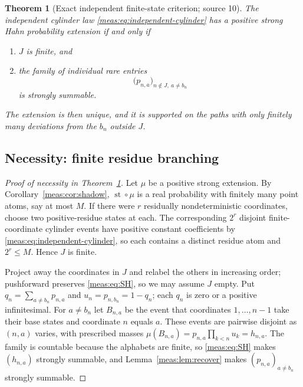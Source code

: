 \documentclass[11pt]{article}
\numberwithin{equation}{section}
\newtheorem{theorem}{Theorem}[section]
\theoremstyle{definition}
\theoremstyle{remark}
\newcommand{\st}{\operatorname{st}}
\begin{document}
\begin{theorem}[Exact independent finite-state criterion; source 10]
\label{meas:thm:independent}
The independent cylinder law \eqref{meas:eq:independent-cylinder} has a
positive strong Hahn probability extension if and only if
\begin{enumerate}[label=(\roman*)]
\item $J$ is finite, and
\item the family of individual rare entries
\begin{equation}\label{meas:eq:rare-family}
 \bigl(p_{n,a}\bigr)_{n\notin J,\ a\ne b_n}
\end{equation}
is strongly summable.
\end{enumerate}
The extension is then unique, and it is supported on the paths with only
finitely many deviations from the $b_n$ outside $J$.
\end{theorem}

\subsection{Necessity: finite residue branching}
\begin{proof}[Proof of necessity in Theorem~\ref{meas:thm:independent}]
Let $\mu$ be a positive strong extension. By Corollary~\ref{meas:cor:shadow},
$\st\circ\mu$ is a real probability with finitely many point atoms, say at most
$M$. If there were $r$ residually nondeterministic coordinates, choose two
positive-residue states at each. The corresponding $2^r$ disjoint
finite-coordinate cylinder events have positive constant coefficients by
\eqref{meas:eq:independent-cylinder}, so each contains a distinct residue atom
and $2^r\le M$. Hence $J$ is finite.

Project away the coordinates in $J$ and relabel the others in increasing
order; pushforward preserves \eqref{meas:eq:SH}, so we may assume $J$ empty.
Put $q_n=\sum_{a\ne b_n}p_{n,a}$ and $u_n=p_{n,b_n}=1-q_n$; each $q_n$ is zero or
a positive infinitesimal. For $a\ne b_n$ let $B_{n,a}$ be the event that
coordinates $1,\ldots,n-1$ take their base states and coordinate $n$ equals
$a$. These events are pairwise disjoint as $(n,a)$ varies, with prescribed
masses $\mu(B_{n,a})=p_{n,a}\prod_{k<n}u_k=h_{n,a}$. The family is countable
because the alphabets are finite, so \eqref{meas:eq:SH} makes $(h_{n,a})$
strongly summable, and Lemma~\ref{meas:lem:recover} makes
$(p_{n,a})_{a\ne b_n}$ strongly summable.
\end{proof}
\end{document}
